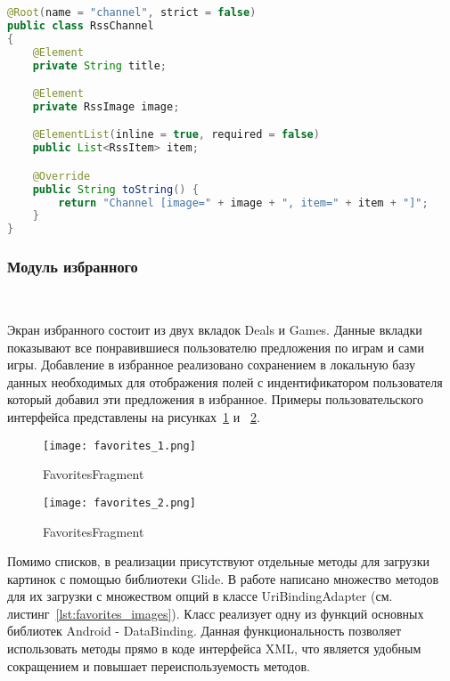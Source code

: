 \begin{lstlisting}[language=Java,label={lst:explore_rss},caption={RssChannel}]
@Root(name = "channel", strict = false)
public class RssChannel
{
    @Element
    private String title;

    @Element
    private RssImage image;

    @ElementList(inline = true, required = false)
    public List<RssItem> item;

    @Override
    public String toString() {
        return "Channel [image=" + image + ", item=" + item + "]";
    }
}
\end{lstlisting}

\subsubsection{Модуль избранного}~\par
Экран избранного состоит из двух вкладок Deals и Games. Данные вкладки показывают все понравившиеся пользователю предложения по играм и сами игры. Добавление в избранное реализовано сохранением в локальную базу данных необходимых для отображения полей с индентификатором пользователя который добавил эти предложения в избранное. Примеры пользовательского интерфейса представлены на рисунках~\ref{fig:arch:favorites_1} и ~\ref{fig:arch:favorites_2}.

\begin{figure}[H]
 \centering
   \texttt{[image: favorites\_1.png]} 
   \caption{FavoritesFragment}
   \label{fig:arch:favorites_1}
\end{figure}

\begin{figure}[H]
 \centering
   \texttt{[image: favorites\_2.png]} 
   \caption{FavoritesFragment}
   \label{fig:arch:favorites_2}
\end{figure}

Помимо списков, в реализации присутствуют отдельные методы для загрузки картинок с помощью библиотеки Glide. В работе написано множество методов для их загрузки с множеством опций в классе UriBindingAdapter (см. листинг~\ref{lst:favorites_images}). Класс реализует одну из функций основных библиотек Android - DataBinding. Данная функциональность позволяет использовать методы прямо в коде интерфейса XML, что является удобным сокращением и повышает переиспользуемость методов.

